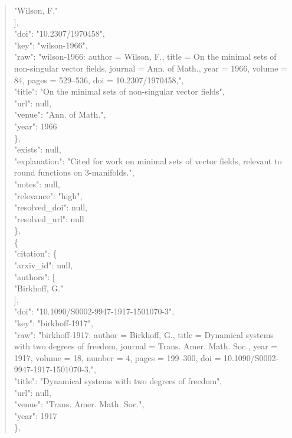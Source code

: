 \documentclass[11pt]{article}
\begin{document}
\begin{quote}
          "Wilson, F."\\
        ],\\
        "doi": "10.2307/1970458",\\
        "key": "wilson-1966",\\
        "raw": "wilson-1966: author = Wilson, F., title = On the minimal sets of non-singular vector fields, journal = Ann. of Math., year = 1966, volume = 84, pages = 529--536, doi = 10.2307/1970458,",\\
        "title": "On the minimal sets of non-singular vector fields",\\
        "url": null,\\
        "venue": "Ann. of Math.",\\
        "year": 1966\\
      \},\\
      "exists": null,\\
      "explanation": "Cited for work on minimal sets of vector fields, relevant to round functions on 3-manifolds.",\\
      "notes": null,\\
      "relevance": "high",\\
      "resolved\_doi": null,\\
      "resolved\_url": null\\
    \},\\
    \{\\
      "citation": \{\\
        "arxiv\_id": null,\\
        "authors": [\\
          "Birkhoff, G."\\
        ],\\
        "doi": "10.1090/S0002-9947-1917-1501070-3",\\
        "key": "birkhoff-1917",\\
        "raw": "birkhoff-1917: author = Birkhoff, G., title = Dynamical systems with two degrees of freedom, journal = Trans. Amer. Math. Soc., year = 1917, volume = 18, number = 4, pages = 199--300, doi = 10.1090/S0002-9947-1917-1501070-3,",\\
        "title": "Dynamical systems with two degrees of freedom",\\
        "url": null,\\
        "venue": "Trans. Amer. Math. Soc.",\\
        "year": 1917\\
      \},\\

\end{quote}
\end{document}
